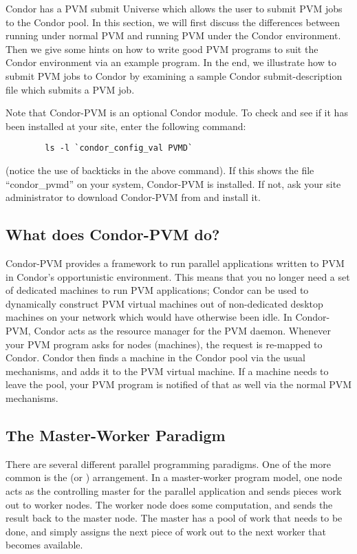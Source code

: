
\newcommand{\func}[1]{\texttt{#1}}

Condor has a PVM submit Universe which allows the user to submit PVM jobs to
the Condor pool.  In this section, we will first
discuss the differences between running under normal PVM and running PVM under the Condor
environment.  Then we give some hints on how to write good PVM
programs to suit the Condor environment via an example program.  In the
end, we illustrate how to submit PVM jobs to Condor by examining a
sample Condor submit-description file which submits a PVM job.

Note that Condor-PVM is an optional Condor module.  To check and see if
it has been installed at your site, enter the following command:
\begin{verbatim}
        ls -l `condor_config_val PVMD`
\end{verbatim}
(notice the use of backticks in the above command).  If this shows the
file ``condor\_pvmd'' on your system, Condor-PVM is installed.  If not,
ask your site administrator to download Condor-PVM from
 and install it.

\subsection{What does Condor-PVM do?}

Condor-PVM provides a framework to run parallel applications written to
PVM in Condor's opportunistic environment.  This means that you no
longer need a
set of dedicated machines to run PVM applications; Condor can be used to dynamically 
construct PVM virtual machines out of non-dedicated desktop machines on your network
which would have otherwise been idle.   In Condor-PVM, Condor acts as the
resource manager for the PVM daemon.  Whenever your PVM program asks
for nodes (machines), the request is re-mapped to Condor.  Condor then
finds a machine in the Condor pool via the usual mechanisms, and adds it
to the PVM virtual machine.  If a machine needs to leave the pool, your
PVM program is notified of that as well via the normal PVM mechanisms.

\subsection{The Master-Worker Paradigm}

There are several different parallel programming paradigms.  One of the
more common is the  (or )
arrangement.  In a master-worker program model, one node acts as the
controlling master for the parallel application and sends pieces work out to worker nodes.  The
worker node does some computation, and sends the result back to the
master node.  The master has a pool of work that needs to be
done, and simply assigns the next piece of work out to the next worker
that becomes available.  

